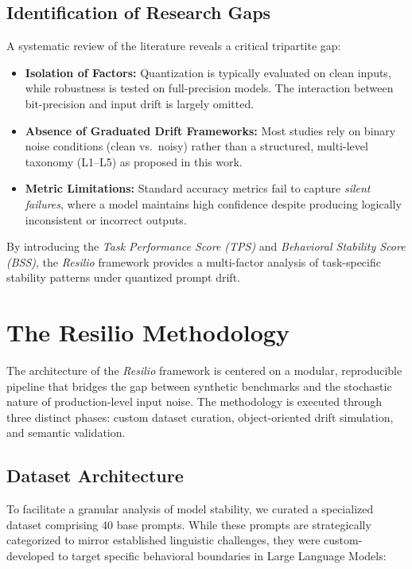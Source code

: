 \documentclass[conference]{IEEEtran}
\begin{document}
\subsection{Identification of Research Gaps}

A systematic review of the literature reveals a critical tripartite gap:

\begin{itemize}
\item \textbf{Isolation of Factors:} Quantization is typically evaluated on clean inputs, while robustness is tested on full-precision models. The interaction between bit-precision and input drift is largely omitted.

\item \textbf{Absence of Graduated Drift Frameworks:} Most studies rely on binary noise conditions (clean vs.\ noisy) rather than a structured, multi-level taxonomy (L1--L5) as proposed in this work.

\item \textbf{Metric Limitations:} Standard accuracy metrics fail to capture \textit{silent failures}, where a model maintains high confidence despite producing logically inconsistent or incorrect outputs.
\end{itemize}

By introducing the \textit{Task Performance Score (TPS)} and \textit{Behavioral Stability Score (BSS)}, the \textit{Resilio} framework provides a multi-factor analysis of task-specific stability patterns under quantized prompt drift.

\section{The Resilio Methodology}

The architecture of the \textit{Resilio} framework is centered on a modular, reproducible pipeline that bridges the gap between synthetic benchmarks and the stochastic nature of production-level input noise. The methodology is executed through three distinct phases: custom dataset curation, object-oriented drift simulation, and semantic validation.

\subsection{Dataset Architecture}

To facilitate a granular analysis of model stability, we curated a specialized dataset comprising 40 base prompts. While these prompts are strategically categorized to mirror established linguistic challenges, they were custom-developed to target specific behavioral boundaries in Large Language Models:
\end{document}
